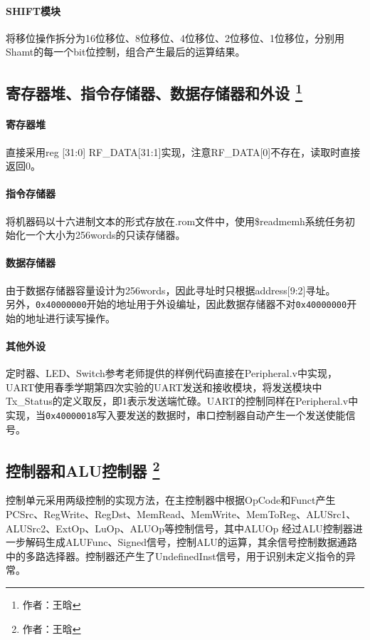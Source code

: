 \documentclass{article}
\begin{document}
            \paragraph*{SHIFT模块}
            将移位操作拆分为16位移位、8位移位、4位移位、2位移位、1位移位，分别用Shamt的每一个bit位控制，组合产生最后的运算结果。

        \subsection{寄存器堆、指令存储器、数据存储器和外设 \protect\footnote{作者：王晗}}
            \paragraph*{寄存器堆}
                直接采用reg [31:0] RF\_DATA[31:1]实现，注意RF\_DATA[0]不存在，读取时直接返回0。
            \paragraph*{指令存储器}
                将机器码以十六进制文本的形式存放在.rom文件中，使用\$readmemh系统任务初始化一个大小为256words的只读存储器。
            \paragraph*{数据存储器}
                由于数据存储器容量设计为256words，因此寻址时只根据address[9:2]寻址。 \\
                另外，\texttt{0x40000000}开始的地址用于外设编址，因此数据存储器不对\texttt{0x40000000}开始的地址进行读写操作。
            \paragraph*{其他外设}
                定时器、LED、Switch参考老师提供的样例代码直接在Peripheral.v中实现，UART使用春季学期第四次实验的UART发送和接收模块，将发送模块中Tx\_Status的定义取反，即1表示发送端忙碌。UART的控制同样在Peripheral.v中实现，当\texttt{0x40000018}写入要发送的数据时，串口控制器自动产生一个发送使能信号。

        \subsection{控制器和ALU控制器 \protect\footnote{作者：王晗}}
            控制单元采用两级控制的实现方法，在主控制器中根据OpCode和Funct产生PCSrc、RegWrite、RegDst、MemRead、MemWrite、MemToReg、ALUSrc1、ALUSrc2、ExtOp、LuOp、ALUOp等控制信号，其中ALUOp 经过ALU控制器进一步解码生成ALUFunc、Signed信号，控制ALU的运算，其余信号控制数据通路中的多路选择器。控制器还产生了UndefinedInst信号，用于识别未定义指令的异常。
\end{document}
